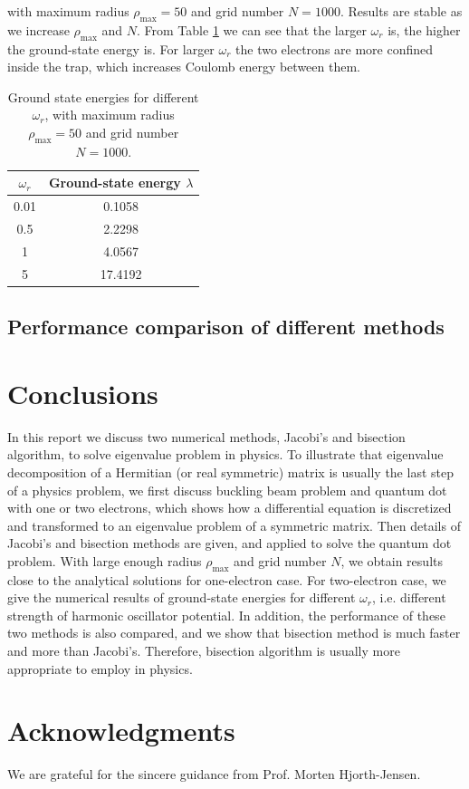 \documentclass{article}
\begin{document}
with maximum radius $\rho_{\max}=50$ and grid number $N=1000$. 
Results are stable as we increase $\rho_{\max}$ and $N$. 
From Table \ref{tab:twoelectron} we can see that the larger $\omega_r$ is, the higher the ground-state energy is. 
For larger $\omega_r$ the two electrons are more confined inside the trap, 
which increases Coulomb energy between them. 
\begin{table}[tb]
	\centering
	\caption{Ground state energies for different $\omega_r$, 
		with maximum radius $\rho_{\max}=50$ and grid number $N=1000$. }
	\label{tab:twoelectron}
	\begin{tabular}{cc}
		\hline
		\hline
		$\omega_r$   & Ground-state energy $\lambda$  \\
		\hline
		0.01 & 0.1058 \\
		0.5  & 2.2298 \\
		1    & 4.0567 \\
		5    & 17.4192\\
		\hline
		\hline
	\end{tabular}
\end{table}

	\subsection{Performance comparison of different methods}\label{perf}
	 
	
	\section{Conclusions}\label{conclude}
In this report we discuss two numerical methods, Jacobi's and bisection algorithm, to solve eigenvalue problem in physics. 
To illustrate that eigenvalue decomposition of a Hermitian (or real symmetric) matrix is usually the last step of a physics problem, 
we first discuss buckling beam problem and quantum dot with one or two electrons, 
which shows how a differential equation is discretized and transformed to an eigenvalue problem of a symmetric matrix. 
Then details of Jacobi's and bisection methods are given, and applied to solve the quantum dot problem. 
With large enough radius $\rho_{\max}$ and grid number $N$, we obtain results close to the analytical solutions for one-electron case. 
For two-electron case, we give the numerical results of ground-state energies for different $\omega_r$, 
i.e. different strength of harmonic oscillator potential. 
In addition, the performance of these two methods is also compared, 
and we show that bisection method is much faster and more than Jacobi's. 
Therefore, bisection algorithm is usually more appropriate to employ in physics. 
	
	\section*{Acknowledgments}
	We are grateful for the sincere guidance from Prof. Morten Hjorth-Jensen. 
	
	\nocite{*} 
	
	
\end{document}

